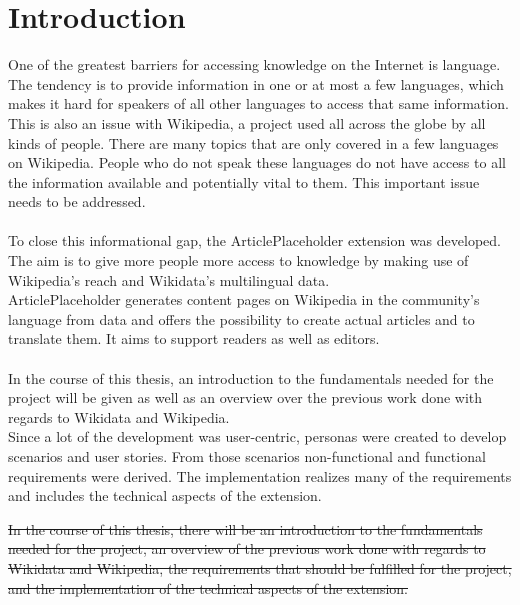 \chapter{Introduction}

One of the greatest barriers for accessing knowledge on the Internet is language. The tendency is to provide information in one or at most a few languages, which makes it hard for speakers of all other languages to access that same information. This is also an issue with Wikipedia, a project used all across the globe by all kinds of people. There are many topics that are only covered in a few languages on Wikipedia. People who do not speak these languages do not have access to all the information available and potentially vital to them. This important issue needs to be addressed. \\
\\
To close this informational gap, the ArticlePlaceholder extension was developed. The aim is to give more people more access to knowledge by making use of Wikipedia’s reach and Wikidata’s multilingual data. \\
ArticlePlaceholder generates content pages on Wikipedia in the community's language from data and offers the possibility to create actual articles and to translate them. It aims to support readers as well as editors. \\
\\
In the course of this thesis, an introduction to the fundamentals needed for the project will be given as well as an overview over the previous work done with regards to Wikidata and Wikipedia. \\
Since a lot of the development was user-centric, personas were created to develop scenarios and user stories. From those scenarios non-functional and functional requirements were derived. The implementation realizes many of the requirements and includes the technical aspects of the extension.

\st{In the course of this thesis, there will be an introduction to the fundamentals needed for the project, an overview of the previous work done with regards to Wikidata and Wikipedia, the requirements that should be fulfilled for the project, and the implementation of the technical aspects of the extension.} 